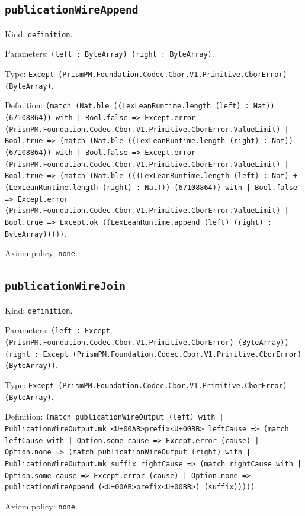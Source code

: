 \documentclass[11pt]{article}
\begin{document}
\subsection*{\texttt{publicationWireAppend}}
\noindent Kind: \texttt{definition}.\par
\noindent Parameters: \texttt{(left : ByteArray) (right : ByteArray)}.\par
\noindent Type: \texttt{Except (PrismPM.Foundation.Codec.Cbor.V1.Primitive.CborError) (ByteArray)}.\par
\noindent Definition: \texttt{(match (Nat.ble ((LexLeanRuntime.length (left) : Nat)) (67108864)) with | Bool.false => Except.error (PrismPM.Foundation.Codec.Cbor.V1.Primitive.CborError.ValueLimit) | Bool.true => (match (Nat.ble ((LexLeanRuntime.length (right) : Nat)) (67108864)) with | Bool.false => Except.error (PrismPM.Foundation.Codec.Cbor.V1.Primitive.CborError.ValueLimit) | Bool.true => (match (Nat.ble (((LexLeanRuntime.length (left) : Nat) + (LexLeanRuntime.length (right) : Nat))) (67108864)) with | Bool.false => Except.error (PrismPM.Foundation.Codec.Cbor.V1.Primitive.CborError.ValueLimit) | Bool.true => Except.ok ((LexLeanRuntime.append (left) (right) : ByteArray)))))}.\par
\noindent Axiom policy: \texttt{none}.\par
\subsection*{\texttt{publicationWireJoin}}
\noindent Kind: \texttt{definition}.\par
\noindent Parameters: \texttt{(left : Except (PrismPM.Foundation.Codec.Cbor.V1.Primitive.CborError) (ByteArray)) (right : Except (PrismPM.Foundation.Codec.Cbor.V1.Primitive.CborError) (ByteArray))}.\par
\noindent Type: \texttt{Except (PrismPM.Foundation.Codec.Cbor.V1.Primitive.CborError) (ByteArray)}.\par
\noindent Definition: \texttt{(match publicationWireOutput (left) with | PublicationWireOutput.mk <U+00AB>prefix<U+00BB> leftCause => (match leftCause with | Option.some cause => Except.error (cause) | Option.none => (match publicationWireOutput (right) with | PublicationWireOutput.mk suffix rightCause => (match rightCause with | Option.some cause => Except.error (cause) | Option.none => publicationWireAppend (<U+00AB>prefix<U+00BB>) (suffix)))))}.\par
\noindent Axiom policy: \texttt{none}.\par
\end{document}
